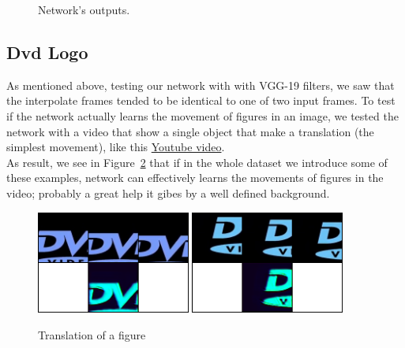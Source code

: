 \documentclass[11pt, a4paper]{article}
\begin{document}
\begin{figure}
		\caption{Network's outputs.}
		\label{output}
	\end{figure}
	
	
	\subsection{Dvd Logo}
	As mentioned above, testing our network with with VGG-19 filters, we saw that the interpolate frames tended to be identical to one of two input frames. To test if the network actually learns the movement of figures in an image, we tested the network with a video that show a single object that make a translation (the simplest movement), like this \href{https://www.youtube.com/watch?v=5mGuCdlCcNM}{Youtube video}.\\
	As result, we see in Figure~\ref{dvd} that if in the whole dataset we introduce some of these examples, network can effectively learns the movements of figures in the video; probably a great help it gibes by a well defined background. 
	
	\begin{figure}
		\centering
		\includegraphics[width=0.45\textwidth]{dvd1}
		\includegraphics[width=0.45\textwidth]{dvd2}
		\caption{Translation of a figure}
		\label{dvd}
	\end{figure} 
	
\end{document}
